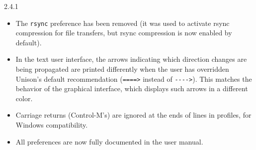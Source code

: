 \begin{changesfromversion}{2.4.1}
\begin{itemize}
\item The \verb|rsync| preference has been removed (it was used to
activate rsync compression for file transfers, but rsync compression is
now enabled by default).
\item  In the text user interface, the arrows indicating which direction
changes are being
  propagated are printed differently when the user has overridden Unison's
  default recommendation (\verb|====>| instead of \verb|---->|).  This
  matches the behavior of the graphical interface, which displays such
  arrows in a different color.
\item Carriage returns (Control-M's) are ignored at the ends of lines in
  profiles, for Windows compatibility.
\item All preferences are now fully documented in the user manual.
\end{itemize}
\end{changesfromversion}


